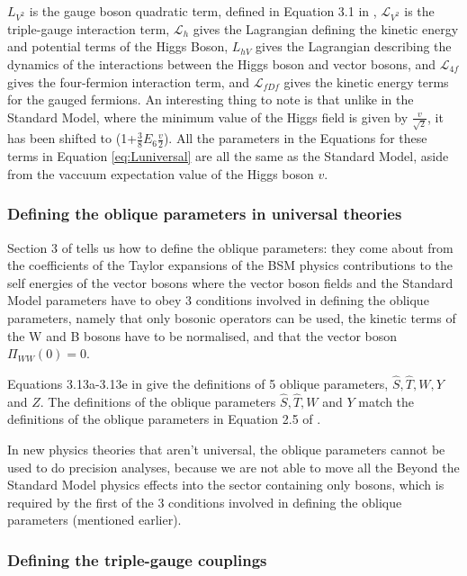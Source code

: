 \documentclass[11pt,oneside,a4paper]{article}
\begin{document}
$L_{V^{2}}$ is the gauge boson quadratic term, defined in Equation 3.1 in \cite{universal}, $\mathcal{L}_{V^{2}}$ is the triple-gauge interaction term, $\mathcal{L}_{h}$ gives the Lagrangian defining the kinetic energy and potential terms of the Higgs Boson, $L_{hV}$ gives the Lagrangian describing the dynamics of the interactions between the Higgs boson and vector bosons, and $\mathcal{L}_{4f}$ gives the four-fermion interaction term, and $\mathcal{L}_{fDf}$ gives the kinetic energy terms for the gauged fermions. An interesting thing to note is that unlike in the Standard Model, where the minimum value of the Higgs field is given by $\frac{v}{\sqrt{2}}$, it has been shifted to (1+$\frac{3}{8}E_{6}\frac{v}{2}$). All the parameters in the Equations for these terms in Equation \ref{eq:Luniversal} are all the same as the Standard Model, aside from the vaccuum expectation value of the Higgs boson $v$. 

\subsubsection{Defining the oblique parameters in universal theories}
Section 3 of \cite{universal} tells us how to define the oblique parameters: they come about from the coefficients of the Taylor expansions of the BSM physics contributions to the self energies of the vector bosons where the vector boson fields and the Standard Model parameters have to obey 3 conditions involved in defining the oblique parameters, namely that only bosonic operators can be used, the kinetic terms of the W and B bosons have to be normalised, and that the vector boson $\Pi_{WW}(0) = 0$. 

Equations 3.13a-3.13e in \cite{universal} give the definitions of 5 oblique parameters, $\hat{S}, \hat{T}, W, Y$ and $Z$. The definitions of the oblique parameters $\hat{S}, \hat{T}, W$ and $Y$ match the definitions of the oblique parameters in Equation 2.5 of \cite{EWprecision}. 


In new physics theories that aren't universal, the oblique parameters cannot be used to do precision analyses, because we are not able to move all the Beyond the Standard Model physics effects into the sector containing only bosons, which is required by the first of the 3 conditions involved in defining the oblique parameters (mentioned earlier). 

\subsubsection{Defining the triple-gauge couplings} 
\end{document}
